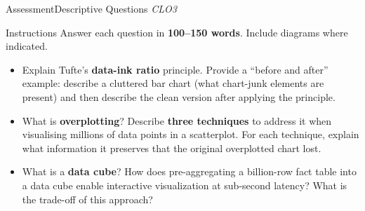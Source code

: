 \documentclass[aspectratio=169,10pt]{beamer}
\begin{document}
\begin{frame}{Assessment\textemdash Descriptive Questions \hfill\small\textit{CLO3}}
  \begin{block}{Instructions}
    Answer each question in \textbf{100--150 words}.  Include diagrams where indicated.
  \end{block}
  \vspace{8pt}
  \begin{itemize}
    \item[\textbf{D1.}] Explain Tufte's \textbf{data-ink ratio} principle.  Provide a ``before and after'' example: describe a cluttered bar chart (what chart-junk elements are present) and then describe the clean version after applying the principle.
  \end{itemize}
  \vspace{8pt}
  \begin{itemize}
    \item[\textbf{D2.}] What is \textbf{overplotting}?  Describe \textbf{three techniques} to address it when visualising millions of data points in a scatterplot.  For each technique, explain what information it preserves that the original overplotted chart lost.
  \end{itemize}
  \vspace{8pt}
  \begin{itemize}
    \item[\textbf{D3.}] What is a \textbf{data cube}?  How does pre-aggregating a billion-row fact table into a data cube enable interactive visualization at sub-second latency?  What is the trade-off of this approach?
  \end{itemize}
\end{frame}
\end{document}
